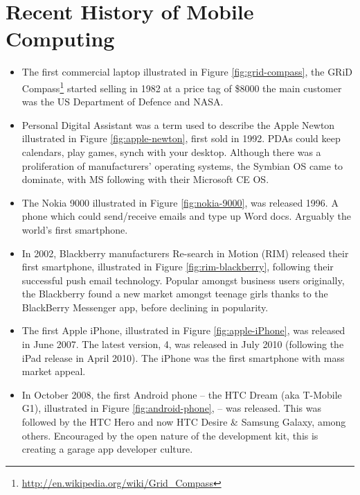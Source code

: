 \documentclass[12pt, a4paper, twoside]{book}
\begin{document}
\section{Recent History of Mobile Computing}

\begin{itemize}

\item The first commercial laptop illustrated in Figure \ref{fig:grid-compass}, the GRiD Compass\footnote{\url{http://en.wikipedia.org/wiki/Grid_Compass}} started selling in 1982 at a price tag of \$8000 the main customer was the US Department of Defence and NASA.

\item Personal Digital Assistant was a term used to describe the Apple Newton  illustrated in Figure \ref{fig:apple-newton}, first sold in 1992. PDAs could keep calendars, play games, synch with your desktop. Although there was a proliferation of manufacturers' operating systems, the Symbian OS came to dominate, with MS following with their Microsoft CE OS.

\item The Nokia 9000  illustrated in Figure \ref{fig:nokia-9000}, was released 1996. A phone which could send/receive emails and type up Word docs. Arguably the world's first smartphone.

\item In 2002, Blackberry manufacturers Re-search in Motion (RIM) released their first smartphone,  illustrated in Figure \ref{fig:rim-blackberry}, following their successful push email technology. Popular amongst business users originally, the Blackberry found a new market amongst teenage girls thanks to the BlackBerry Messenger app, before declining in popularity.

\item The first Apple iPhone, illustrated in Figure \ref{fig:apple-iPhone}, was released in June 2007. The latest version, 4, was released in July 2010 (following the iPad release in April 2010). The iPhone was the first smartphone with mass market appeal.

\item In October 2008, the first Android phone – the HTC Dream (aka T-Mobile G1), illustrated in Figure \ref{fig:android-phone}, – was released. This was followed by the HTC Hero and now HTC Desire \& Samsung Galaxy, among others. Encouraged by the open nature of the development kit, this is creating a garage app developer culture.

\end{itemize}
\end{document}

